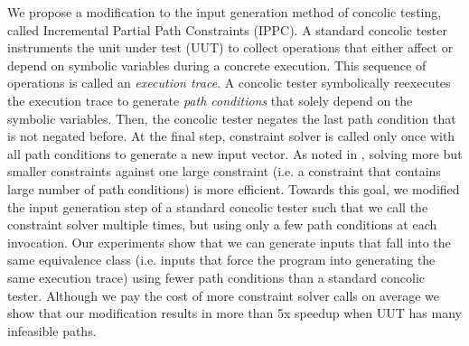 \documentclass[EPiCempty]{easychair}
\begin{document}
We propose a modification to the input generation method of concolic testing, called Incremental Partial Path Constraints (IPPC). A standard concolic tester instruments the unit under test (UUT) to collect operations that either affect or depend on symbolic variables during a concrete execution. This sequence of operations is called an \emph{execution trace}. A concolic tester symbolically reexecutes the execution trace to generate \emph{path conditions} that solely depend on the symbolic variables. Then, the concolic tester negates the last path condition that is not negated before. At the final step, constraint solver is called only once with all path conditions to generate a new input vector. As noted in \cite{Godefroid:2005:DDA:1064978.1065036}, solving more but smaller constraints against one large constraint (i.e. a constraint that contains large number of path conditions) is more efficient. Towards this goal, we modified the input generation step of a standard concolic tester such that we call the constraint solver multiple times, but using only a few path conditions at each invocation. Our experiments show that we can generate inputs that fall into the same equivalence class (i.e. inputs that force the program into generating the same execution trace) using fewer path conditions than a standard concolic tester. Although we pay the cost of more constraint solver calls on average we show that our modification results in more than 5x speedup when UUT has many infeasible paths.

\end{document}
